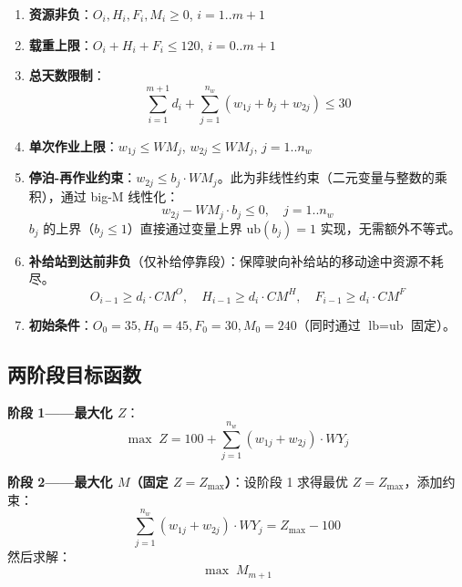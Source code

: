 \documentclass[12pt,a4paper]{ctexart}
\theoremstyle{definition}
\begin{document}
\begin{enumerate}
  \item \textbf{资源非负}：$O_i,H_i,F_i,M_i\ge 0$, $i=1..m+1$
  \item \textbf{载重上限}：$O_i+H_i+F_i\le 120$, $i=0..m+1$
  \item \textbf{总天数限制}：
    \begin{equation}
      \sum_{i=1}^{m+1} d_i + \sum_{j=1}^{n_w} (w_{1j}+b_j+w_{2j}) \le 30
    \end{equation}
  \item \textbf{单次作业上限}：$w_{1j}\le WM_j$, $w_{2j}\le WM_j$, $j=1..n_w$
  \item \textbf{停泊-再作业约束}：$w_{2j}\le b_j\cdot WM_j$。此为非线性约束（二元变量与整数的乘积），通过 big-M 线性化：
    \begin{equation}
      w_{2j} - WM_j\cdot b_j \le 0,\quad j=1..n_w
    \end{equation}
    $b_j$ 的上界（$b_j\le 1$）直接通过变量上界 $\text{ub}(b_j)=1$ 实现，无需额外不等式。
  \item \textbf{补给站到达前非负}（仅补给停靠段）：保障驶向补给站的移动途中资源不耗尽。
    \begin{equation}
      O_{i-1}\ge d_i\cdot CM^O,\quad H_{i-1}\ge d_i\cdot CM^H,\quad F_{i-1}\ge d_i\cdot CM^F
    \end{equation}
  \item \textbf{初始条件}：$O_0=35, H_0=45, F_0=30, M_0=240$（同时通过 $\text{lb}=\text{ub}$ 固定）。
\end{enumerate}

\subsection{两阶段目标函数}

\textbf{阶段 1——最大化 $Z$}：
\begin{equation}\label{eq:milp-stage1}
  \max\; Z = 100 + \sum_{j=1}^{n_w} (w_{1j}+w_{2j})\cdot WY_j
\end{equation}

\textbf{阶段 2——最大化 $M$（固定 $Z=Z_{\max}$）}：设阶段 1 求得最优 $Z=Z_{\max}$，添加约束：
\begin{equation}
  \sum_{j=1}^{n_w} (w_{1j}+w_{2j})\cdot WY_j = Z_{\max}-100
\end{equation}
然后求解：
\begin{equation}\label{eq:milp-stage2}
  \max\; M_{m+1}
\end{equation}
\end{document}
